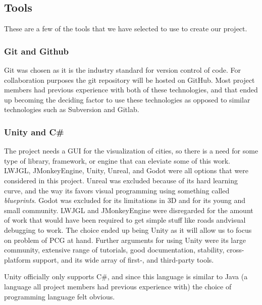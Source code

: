 \subsection{Tools}
These are a few of the tools that we have selected to use to create our project.

\subsubsection{Git and Github}
Git was chosen as it is the industry standard for version control of code.
For collaboration purposes the git repository will be hosted on GitHub.
Most project members had previous experience with both of these technologies,
and that ended up becoming the deciding factor to use these technologies as opposed to similar technologies such as Subversion and Gitlab.

\subsubsection{Unity and C\#}
The project needs a GUI for the visualization of cities, so there is a need for some type of library, framework, or engine that can eleviate some of this work.
LWJGL, JMonkeyEngine, Unity, Unreal, and Godot were all options that were considered in this project.
Unreal was excluded because of its hard learning curve, and the way its favors visual
programming using something called \textit{blueprints}.
Godot was excluded for its limitations in 3D and for its young and small community.
LWJGL and JMonkeyEngine were disregarded for the amount of work that would have been required to get simple stuff like roads andvisual debugging to work.
The choice ended up being Unity as it will allow us to focus on problem of PCG at hand.
Further arguments for using Unity were its large community, extensive range of tutorials, good documentation, stability, cross-platform support, and its wide array of first-, and third-party tools.

Unity officially only supports C\#, and since this language is similar to Java (a language all project members had previous experience with) the choice of programming language felt obvious.